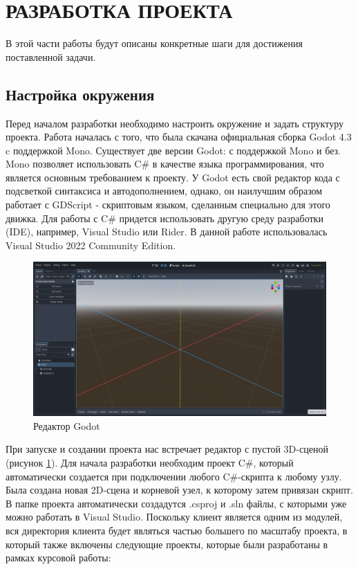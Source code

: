 \section{РАЗРАБОТКА ПРОЕКТА}

        В этой части работы будут описаны конкретные шаги для достижения поставленной задачи.

    \subsection{Настройка окружения}

        Перед началом разработки необходимо настроить окружение и задать структуру проекта. Работа началась с того, что была скачана официальная сборка Godot 4.3 c поддержкой Mono. 
        Существует две версии Godot: с поддержкой Mono и без. Mono позволяет использовать C\# в качестве языка программирования, что является основным требованием к проекту.
        У Godot есть свой редактор кода с подсветкой синтаксиса и автодополнением, однако, он наилучшим образом работает с GDScript - скриптовым языком, сделанным специально для этого
        движка. Для работы с C\# придется использовать другую среду разработки (IDE), например, Visual Studio или Rider. В данной работе использовалась Visual Studio 2022 Community Edition.
        \begin{figure}[H]
            \centering
            \includegraphics[width=\textwidth]{pictures/godot-editor.png}
            \caption{Редактор Godot}\label{ris2.1}
        \end{figure}
        При запуске и создании проекта нас встречает редактор с пустой 3D-сценой (рисунок \ref{ris2.1}). Для начала разработки необходим проект C\#, который автоматически создается при
        подключении любого C\#-скрипта к любому узлу. Была создана новая 2D-сцена и корневой узел, к которому затем привязан скрипт. В папке проекта автоматически создадутся .csproj и .sln файлы, с
        которыми уже можно работать в Visual Studio. Поскольку клиент является одним из модулей, вся директория клиента будет являться частью большего по масштабу проекта, в который
        также включены следующие проекты, которые были разработаны в рамках курсовой работы:

